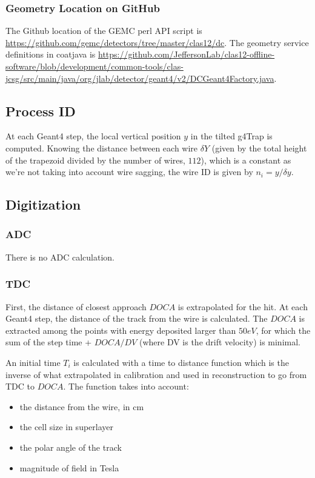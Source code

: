 \subsubsection{Geometry Location on GitHub}
The Github location of the GEMC perl API script is \url{https://github.com/gemc/detectors/tree/master/clas12/dc}.
The geometry service definitions in coatjava is \url{https://github.com/JeffersonLab/clas12-offline-software/blob/development/common-tools/clas-jcsg/src/main/java/org/jlab/detector/geant4/v2/DCGeant4Factory.java}.

\subsection{Process ID}
At each Geant4 step, the local vertical position $y$ in the tilted g4Trap is computed. Knowing the distance
between each wire $\delta Y$ (given by the total height of the trapezoid divided by the number of wires, $112$), which is a constant as we're not taking into
account wire sagging, the wire ID is given by $n_i = y / \delta y$.

\subsection{Digitization}

\subsubsection{ADC}
There is no ADC calculation.

\subsubsection{TDC}
First, the distance of closest approach $DOCA$ is extrapolated for the hit. At each Geant4 step, the distance of the track from the wire is calculated.
The $DOCA$ is extracted among the points with energy deposited larger than $50 eV$, for which the sum of the step time + $DOCA / DV$ (where DV is the drift velocity) is minimal.

An initial time $T_i$ is calculated with a time to distance function which is the inverse of what extrapolated in calibration and used in reconstruction to go from TDC to $DOCA$.
The function takes into account:

\begin{itemize}
	\item the distance from the wire, in cm
	\item the cell size in superlayer
	\item the polar angle of the track
	\item magnitude of field in Tesla
\end{itemize}

